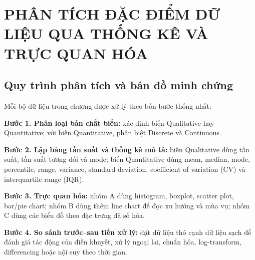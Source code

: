 \chapter{PHÂN TÍCH ĐẶC ĐIỂM DỮ LIỆU QUA THỐNG KÊ VÀ TRỰC QUAN HÓA}

\startcontents[chapters]

\section*{Quy trình phân tích và bản đồ minh chứng}

Mỗi bộ dữ liệu trong chương được xử lý theo bốn bước thống nhất:

\begingroup
\setlength{\parindent}{0pt}
\setlength{\parskip}{0.75\baselineskip}

\textbf{Bước 1. Phân loại bản chất biến:} xác định biến Qualitative hay Quantitative; với biến Quantitative, phân biệt Discrete và Continuous.

\textbf{Bước 2. Lập bảng tần suất và thống kê mô tả:} biến Qualitative dùng tần suất, tần suất tương đối và mode; biến Quantitative dùng mean, median, mode, percentile, range, variance, standard deviation, coefficient of variation (CV) và interquartile range (IQR).

\textbf{Bước 3. Trực quan hóa:} nhóm A dùng histogram, boxplot, scatter plot, bar/pie chart; nhóm B dùng thêm line chart để đọc xu hướng và mùa vụ; nhóm C dùng các biểu đồ theo đặc trưng đã số hóa.

\textbf{Bước 4. So sánh trước--sau tiền xử lý:} đặt dữ liệu thô cạnh dữ liệu sạch để đánh giá tác động của điền khuyết, xử lý ngoại lai, chuẩn hóa, log-transform, differencing hoặc nội suy theo thời gian.
\endgroup

